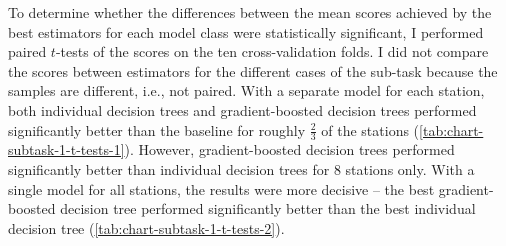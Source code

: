\documentclass[11pt]{extarticle}
\begin{document}
To determine whether the differences between the mean scores achieved by the best
estimators for each model class were statistically significant, I performed paired
$t$-tests of the scores on the ten cross-validation folds.
I did not compare the scores between estimators for the different cases of the sub-task
because the samples are different, i.e., not paired.
With a separate model for each station, both individual decision trees and
gradient-boosted decision trees performed significantly better than the baseline for
roughly $\frac{2}{3}$ of the stations (\cref{tab:chart-subtask-1-t-tests-1}).
However, gradient-boosted decision trees performed significantly better than individual
decision trees for $8$ stations only.
With a single model for all stations, the results were more decisive -- the best
gradient-boosted decision tree performed significantly better than the best individual
decision tree (\cref{tab:chart-subtask-1-t-tests-2}).
\end{document}
